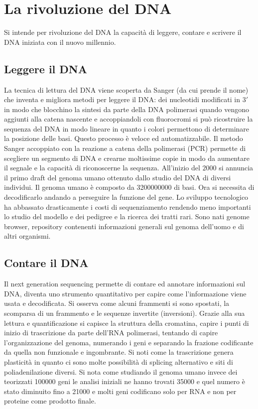\section{La rivoluzione del DNA}
Si intende per rivoluzione del DNA la capacit\`a di leggere, contare e scrivere il DNA iniziata con il nuovo millennio. 

	\subsection{Leggere il DNA}
	La tecnica di lettura del DNA viene scoperta da Sanger (da cui prende il nome) che inventa e migliora metodi per leggere il DNA: dei nucleotidi modificati in $3'$ in modo che blocchino la sintesi da parte della DNA polimerasi quando vengono aggiunti alla catena nascente e accoppiandoli con fluorocromi si pu\`o ricostruire la sequenza del DNA in modo lineare in quanto i colori permettono di determinare la posizione delle basi. 
	Questo processo \`e veloce ed automatizzabile. 
	Il metodo Sanger accoppiato con la reazione a catena della polimerasi (PCR) permette di scegliere un segmento di DNA e crearne moltissime copie  in modo da aumentare il segnale e la capacit\`a di riconoscerne la sequenza. 
	All'inizio del $2000$ si annuncia il primo draft del genoma umano ottenuto dallo studio del DNA di diversi individui. 
	Il genoma umano \`e composto da \num{3200000000} di basi. 
	Ora si necessita di decodificarlo andando a perseguire la funzione del gene. 
	Lo sviluppo tecnologico ha abbassato drasticamente i costi di sequenziamento rendendo meno importanti lo studio del modello e dei pedigree e la ricerca dei tratti rari. 
	Sono nati genome browser, repository contenenti informazioni generali sul genoma dell'uomo e di altri organismi. 

	\subsection{Contare il DNA}
	Il next generation sequencing permette di contare ed annotare informazioni sul DNA, diventa uno strumento quantitativo per capire come l'informazione viene usata e decodificata. 
	Si osserva come alcuni frammenti si sono spostati, la scomparsa di un frammento e le sequenze invertite (inversioni). 
	Grazie alla sua lettura e quantificazione si capisce la struttura della cromatina, capire i punti di inizio di trascrizione da parte dell'RNA polimerasi, tentando di capire l'organizzazione del genoma, numerando i geni e separando la frazione codificante
	da quella non funzionale e ingombrante. 
	Si noti come la trascrizione genera plasticit\`a in quanto ci sono molte possibilit\`a di splicing alternativo e siti di poliadenilazione diversi. 
	Si nota come studiando il genoma umano invece dei teorizzati \num{100000} geni le analisi iniziali ne hanno trovati \num{35000} e quel numero \`e stato diminuito fino a \num{21000} e molti geni codificano solo per RNA e non per proteine come prodotto finale.

